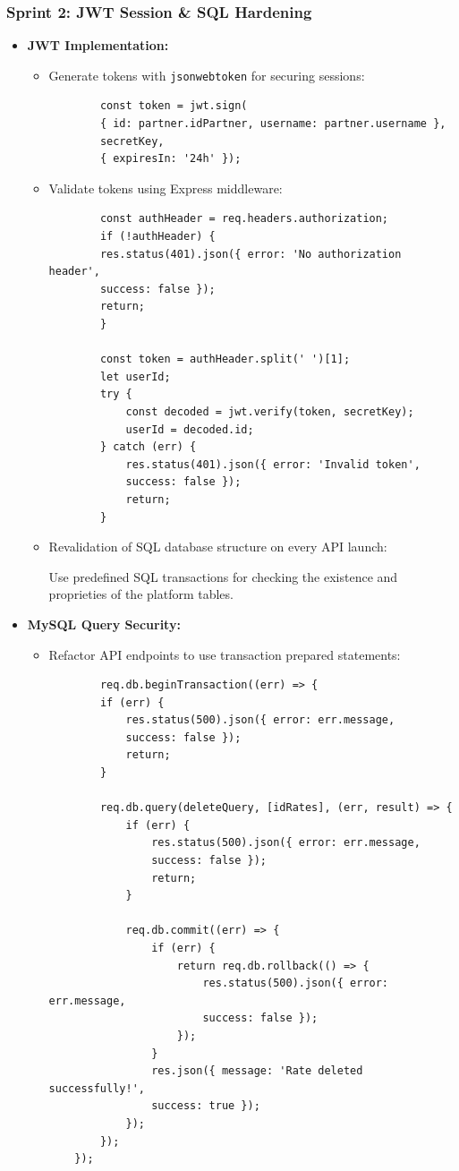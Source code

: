 \subsubsection*{Sprint 2: JWT Session \& SQL Hardening}  
\begin{itemize}  
    \item \textbf{JWT Implementation:}  
    \begin{itemize}  
        \item Generate tokens with \texttt{jsonwebtoken} for securing sessions:  
        \begin{verbatim} 
        const token = jwt.sign(
        { id: partner.idPartner, username: partner.username },
        secretKey,
        { expiresIn: '24h' });
        \end{verbatim}  
        \item Validate tokens using Express middleware:  
        \begin{verbatim}  
        const authHeader = req.headers.authorization;
        if (!authHeader) {
        res.status(401).json({ error: 'No authorization header',
        success: false });
        return;
        }

        const token = authHeader.split(' ')[1];
        let userId;
        try {
            const decoded = jwt.verify(token, secretKey);
            userId = decoded.id;
        } catch (err) {
            res.status(401).json({ error: 'Invalid token',
            success: false });
            return;
        } 
        \end{verbatim} 
        \item Revalidation of SQL database structure on every API launch: 

Use predefined SQL transactions for checking the existence and proprieties of the platform tables.
    \end{itemize}  
    \item \textbf{MySQL Query Security:}  
    \begin{itemize}  
        \item Refactor API endpoints to use transaction prepared statements:  
        \begin{verbatim}  
        req.db.beginTransaction((err) => {
        if (err) {
            res.status(500).json({ error: err.message,
            success: false });
            return;
        }

        req.db.query(deleteQuery, [idRates], (err, result) => {
            if (err) {
                res.status(500).json({ error: err.message,
                success: false });
                return;
            }

            req.db.commit((err) => {
                if (err) {
                    return req.db.rollback(() => {
                        res.status(500).json({ error: err.message,
                        success: false });
                    });
                }
                res.json({ message: 'Rate deleted successfully!',
                success: true });
            });
        });
    });
        \end{verbatim}  
\end{itemize}  
\end{itemize}

